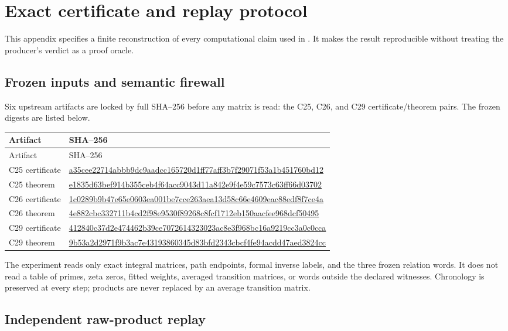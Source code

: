 \section{Exact certificate and replay protocol}
\label{app:certificates}

This appendix specifies a finite reconstruction of every computational claim
used in .  It makes the result reproducible without treating
the producer's verdict as a proof oracle.

\subsection{Frozen inputs and semantic firewall}

Six upstream artifacts are locked by full SHA--256 before any matrix is read:
the C25, C26, and C29 certificate/theorem pairs.  The frozen digests are
listed below.

\begin{longtable}{@{}p{}p{}@{}}
\toprule
Artifact & SHA--256 \\
\midrule
\endfirsthead
\toprule
Artifact & SHA--256 \\
\midrule
\endhead
C25 certificate &
\url{a35cee22714abbb9dc9aadcc165720d1ff77aff3b7f29071f53a1b451760bd12} \\
C25 theorem &
\url{e1835d63bef914b355ceb4f64acc9043d11a842e9f4e59c7573c63ff66d03702} \\
C26 certificate &
\url{1c0289b9b47e65e0603ea001be7cce263aea13d58c66e4609eac88edf8f7ce4a} \\
C26 theorem &
\url{4e882cbc332711b4cd2f98e9530f89268c8fcf1712eb150aacfee968dcf50495} \\
C29 certificate &
\url{412840c37d2e474462b39ce7072614323023ac8e3f968bc16a9219cc3a0c0cca} \\
C29 theorem &
\url{9b53a2d2971f9b3ac7e43193860345d83bfd2343cbcf4fe94acdd47aed3824cc} \\
\bottomrule
\end{longtable}

The experiment reads only exact integral matrices, path endpoints, formal
inverse labels, and the three frozen relation words.  It does not read a table
of primes, zeta zeros, fitted weights, averaged transition matrices, or words
outside the declared witnesses.  Chronology is preserved at every step;
products are never replaced by an average transition matrix.

\subsection{Independent raw-product replay}

